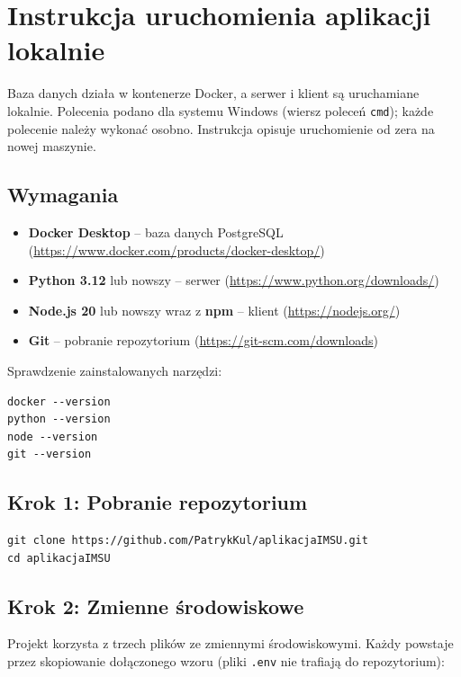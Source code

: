 \section{Instrukcja uruchomienia aplikacji lokalnie}
\label{sec:setup}

Baza danych działa w kontenerze Docker, a serwer i klient są uruchamiane lokalnie. Polecenia podano dla systemu Windows (wiersz poleceń \texttt{cmd}); każde polecenie należy wykonać osobno. Instrukcja opisuje uruchomienie od zera na nowej maszynie.

\subsection{Wymagania}

\begin{itemize}[leftmargin=*]
    \item \textbf{Docker Desktop} -- baza danych PostgreSQL (\url{https://www.docker.com/products/docker-desktop/})
    \item \textbf{Python 3.12} lub nowszy -- serwer (\url{https://www.python.org/downloads/})
    \item \textbf{Node.js 20} lub nowszy wraz z \textbf{npm} -- klient (\url{https://nodejs.org/})
    \item \textbf{Git} -- pobranie repozytorium (\url{https://git-scm.com/downloads})
\end{itemize}

Sprawdzenie zainstalowanych narzędzi:

\begin{lstlisting}
docker --version
python --version
node --version
git --version
\end{lstlisting}

\subsection{Krok 1: Pobranie repozytorium}

\begin{lstlisting}
git clone https://github.com/PatrykKul/aplikacjaIMSU.git
cd aplikacjaIMSU
\end{lstlisting}

\subsection{Krok 2: Zmienne środowiskowe}

Projekt korzysta z trzech plików ze zmiennymi środowiskowymi. Każdy powstaje przez skopiowanie dołączonego wzoru (pliki \texttt{.env} nie trafiają do repozytorium):

